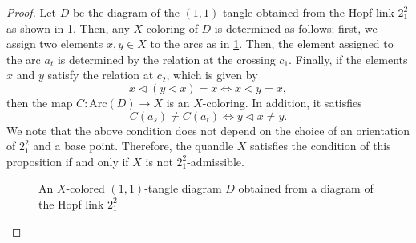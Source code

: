 \documentclass[10pt,a4paper]{amsart}
\newcommand{\qop}{\triangleleft}
\begin{document}
\begin{proof}
  Let $D$ be the diagram of the $(1,1)$-tangle obtained from the Hopf link $2_{1}^{2}$ as shown in \cref{Fig:hopftanglediagram}.
  Then, any $X$-coloring of $D$ is determined as follows:
  first,
  we assign two elements $x, y \in X$ to the arcs as in \cref{Fig:hopftanglediagram}.
  Then, the element assigned to the arc $a_{t}$ is determined by the relation at the crossing $c_{1}$.
  Finally, if the elements $x$ and $y$ satisfy the relation at $c_{2}$, which is given by
  \begin{equation*}
    x \qop (y \qop x) = x \Leftrightarrow x \qop y = x,
  \end{equation*}
  then the map $C: \mathrm{Arc}(D) \to X$ is an $X$-coloring.
  In addition,
  it satisfies
  \begin{equation*}
    C(a_{s}) \neq C(a_{t}) \Leftrightarrow y \qop x \neq y.
  \end{equation*}
  We note that the above condition does not depend on the choice of an orientation of $2_{1}^{2}$ and a base point.
  Therefore,
  the quandle $X$ satisfies the condition of this proposition if and only if $X$ is not $2_{1}^{2}$-admissible.  
  \begin{figure}[h]
    \centering
    
    \caption{An $X$-colored $(1,1)$-tangle diagram $D$ obtained from a diagram of the Hopf link $2_{1}^{2}$}
    \label{Fig:hopftanglediagram}
  \end{figure}
\end{proof}
\end{document}
